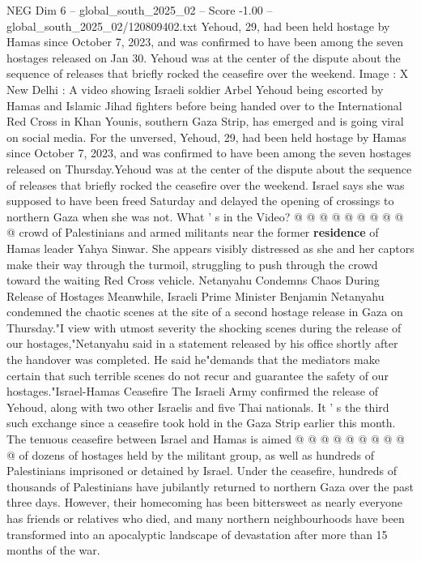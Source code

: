 \begin{textsample}{NEG Dim 6 – global\_south\_2025\_02 – Score -1.00 – global\_south\_2025\_02/120809402.txt}  \label{ex:f6_neg_045}
Yehoud, 29, had been held hostage by Hamas since October 7, 2023, and was confirmed to have been among the seven hostages released on Jan 30.
Yehoud was at the center of the dispute about the sequence of releases that briefly rocked the ceasefire over the weekend.
Image : X New Delhi : A video showing Israeli soldier Arbel Yehoud being escorted by Hamas and Islamic Jihad fighters before being handed over to the International Red Cross in Khan Younis, southern Gaza Strip, has emerged and is going viral on social media.
For the unversed, Yehoud, 29, had been held hostage by Hamas since October 7, 2023, and was confirmed to have been among the seven hostages released on Thursday.Yehoud was at the center of the dispute about the sequence of releases that briefly rocked the ceasefire over the weekend.
Israel says she was supposed to have been freed Saturday and delayed the opening of crossings to northern Gaza when she was not.
What ' s in the Video? @ @ @ @ @ @ @ @ @ @ crowd of Palestinians and armed militants near the former \textbf{residence} of Hamas leader Yahya Sinwar.
She appears visibly distressed as she and her captors make their way through the turmoil, struggling to push through the crowd toward the waiting Red Cross vehicle.
Netanyahu Condemns Chaos During Release of Hostages Meanwhile, Israeli Prime Minister Benjamin Netanyahu condemned the chaotic scenes at the site of a second hostage release in Gaza on Thursday."I view with utmost severity the shocking scenes during the release of our hostages,"Netanyahu said in a statement released by his office shortly after the handover was completed.
He said he"demands that the mediators make certain that such terrible scenes do not recur and guarantee the safety of our hostages."Israel-Hamas Ceasefire The Israeli Army confirmed the release of Yehoud, along with two other Israelis and five Thai nationals.
It ' s the third such exchange since a ceasefire took hold in the Gaza Strip earlier this month.
The tenuous ceasefire between Israel and Hamas is aimed @ @ @ @ @ @ @ @ @ @ of dozens of hostages held by the militant group, as well as hundreds of Palestinians imprisoned or detained by Israel.
Under the ceasefire, hundreds of thousands of Palestinians have jubilantly returned to northern Gaza over the past three days.
However, their homecoming has been bittersweet as nearly everyone has friends or relatives who died, and many northern neighbourhoods have been transformed into an apocalyptic landscape of devastation after more than 15 months of the war.

\end{textsample}
